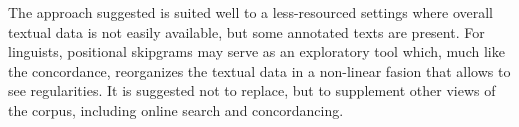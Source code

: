 \documentclass[12pt]{article}
\begin{document}

The approach suggested is suited well to a less-resourced settings
where overall textual data is not easily available, but some annotated
texts are present. For linguists, positional skipgrams may serve as an
exploratory tool which, much like the concordance, reorganizes the
textual data in a non-linear fasion that allows to see
regularities. It is suggested not to replace, but to supplement other
views of the corpus, including online search and concordancing.

\end{document}

